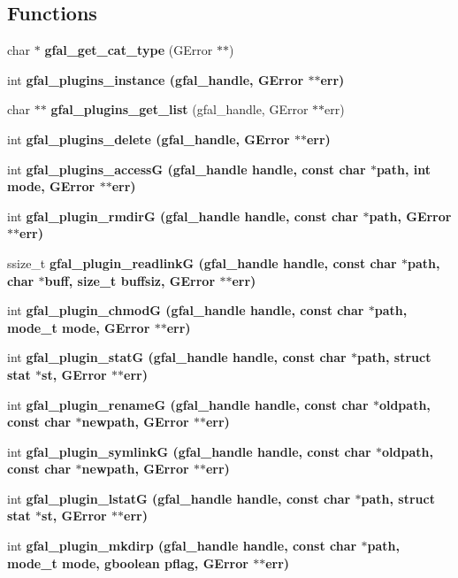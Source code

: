 \subsection*{Functions}
\begin{CompactItemize}
\item 
char $\ast$ \textbf{gfal\_\-get\_\-cat\_\-type} (GError $\ast$$\ast$)\label{gfal__common__plugin_8h_791ad55a9c8aaca0bb8ae74a3538c202}

\item 
int \bf{gfal\_\-plugins\_\-instance} (gfal\_\-handle, GError $\ast$$\ast$err)
\item 
char $\ast$$\ast$ \textbf{gfal\_\-plugins\_\-get\_\-list} (gfal\_\-handle, GError $\ast$$\ast$err)\label{gfal__common__plugin_8h_ca6ec8380220e804c83f6aeae7810b34}

\item 
int \bf{gfal\_\-plugins\_\-delete} (gfal\_\-handle, GError $\ast$$\ast$err)
\item 
int \bf{gfal\_\-plugins\_\-access\-G} (gfal\_\-handle handle, const char $\ast$path, int mode, GError $\ast$$\ast$err)
\item 
int \bf{gfal\_\-plugin\_\-rmdir\-G} (gfal\_\-handle handle, const char $\ast$path, GError $\ast$$\ast$err)
\item 
ssize\_\-t \bf{gfal\_\-plugin\_\-readlink\-G} (gfal\_\-handle handle, const char $\ast$path, char $\ast$buff, size\_\-t buffsiz, GError $\ast$$\ast$err)
\item 
int \bf{gfal\_\-plugin\_\-chmod\-G} (gfal\_\-handle handle, const char $\ast$path, mode\_\-t mode, GError $\ast$$\ast$err)
\item 
int \bf{gfal\_\-plugin\_\-stat\-G} (gfal\_\-handle handle, const char $\ast$path, struct stat $\ast$st, GError $\ast$$\ast$err)
\item 
int \bf{gfal\_\-plugin\_\-rename\-G} (gfal\_\-handle handle, const char $\ast$oldpath, const char $\ast$newpath, GError $\ast$$\ast$err)
\item 
int \bf{gfal\_\-plugin\_\-symlink\-G} (gfal\_\-handle handle, const char $\ast$oldpath, const char $\ast$newpath, GError $\ast$$\ast$err)
\item 
int \bf{gfal\_\-plugin\_\-lstat\-G} (gfal\_\-handle handle, const char $\ast$path, struct stat $\ast$st, GError $\ast$$\ast$err)
\item 
int \bf{gfal\_\-plugin\_\-mkdirp} (gfal\_\-handle handle, const char $\ast$path, mode\_\-t mode, gboolean pflag, GError $\ast$$\ast$err)
\item 

\end{CompactItemize}
